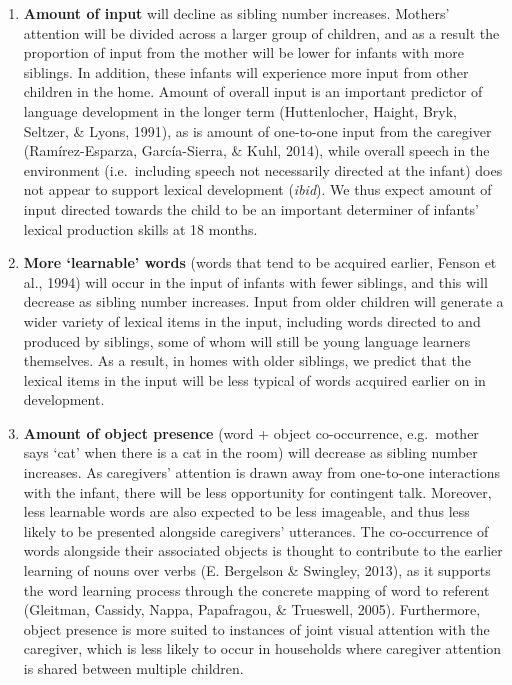 \documentclass[
  english,
  man,floatsintext]{apa6}
\begin{document}
\begin{enumerate}
\def\labelenumi{\arabic{enumi})}
\item
  \textbf{Amount of input} will decline as sibling number increases. Mothers' attention will be divided across a larger group of children, and as a result the proportion of input from the mother will be lower for infants with more siblings. In addition, these infants will experience more input from other children in the home. Amount of overall input is an important predictor of language development in the longer term (Huttenlocher, Haight, Bryk, Seltzer, \& Lyons, 1991), as is amount of one-to-one input from the caregiver (Ramírez-Esparza, García-Sierra, \& Kuhl, 2014), while overall speech in the environment (i.e.~including speech not necessarily directed at the infant) does not appear to support lexical development (\emph{ibid}). We thus expect amount of input directed towards the child to be an important determiner of infants' lexical production skills at 18 months.
\item
  \textbf{More `learnable' words} (words that tend to be acquired earlier, Fenson et al., 1994) will occur in the input of infants with fewer siblings, and this will decrease as sibling number increases. Input from older children will generate a wider variety of lexical items in the input, including words directed to and produced by siblings, some of whom will still be young language learners themselves. As a result, in homes with older siblings, we predict that the lexical items in the input will be less typical of words acquired earlier on in development.
\item
  \textbf{Amount of object presence} (word + object co-occurrence, e.g.~mother says `cat' when there is a cat in the room) will decrease as sibling number increases. As caregivers' attention is drawn away from one-to-one interactions with the infant, there will be less opportunity for contingent talk. Moreover, less learnable words are also expected to be less imageable, and thus less likely to be presented alongside caregivers' utterances. The co-occurrence of words alongside their associated objects is thought to contribute to the earlier learning of nouns over verbs (E. Bergelson \& Swingley, 2013), as it supports the word learning process through the concrete mapping of word to referent (Gleitman, Cassidy, Nappa, Papafragou, \& Trueswell, 2005). Furthermore, object presence is more suited to instances of joint visual attention with the caregiver, which is less likely to occur in households where caregiver attention is shared between multiple children.
\end{enumerate}
\end{document}

